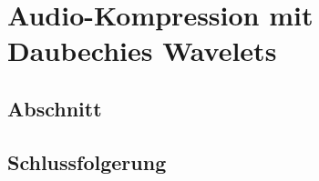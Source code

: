 %
%
%
\chapter{Audio-Kompression mit Daubechies Wavelets\label{chapter:compress}}
\begin{refsection}

\section{Abschnitt}

\section{Schlussfolgerung}

\printbibliography[heading=subbibliography]
\end{refsection}
